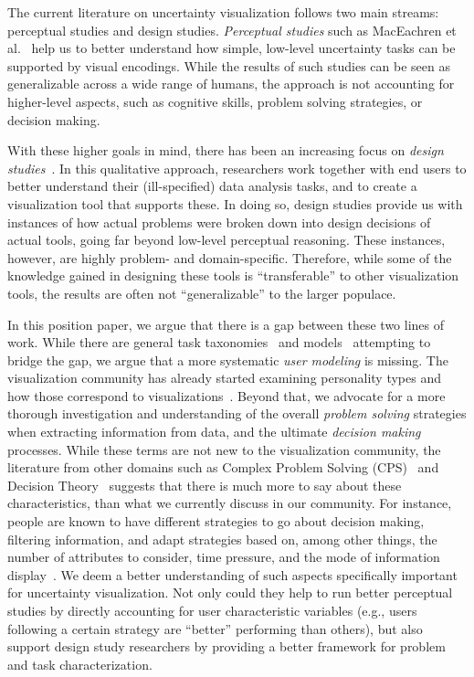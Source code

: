 
The current literature on uncertainty visualization follows two main streams: perceptual studies and design studies.
\emph{Perceptual studies} such as MacEachren et al.~\citep{MacEachren:2012} 
help us to better understand 
how simple, low-level uncertainty tasks can be supported by visual encodings. 
While the results of such studies can be seen as generalizable across a wide 
range of humans, the approach is not accounting for higher-level aspects, such as cognitive skills,
problem solving strategies, or decision making.

With these higher goals in mind, there has been an increasing focus on \emph{design studies}~\citep{Sedlmair:2012}.
In this qualitative approach, researchers work together with end users to better understand their 
(ill-specified) data analysis tasks, and to create a visualization tool
that supports these. In doing so, design studies provide us with instances of how
actual problems were broken down into design decisions of actual tools, going far beyond
low-level perceptual reasoning. These instances, however, are highly problem- and domain-specific.
Therefore, while some of the knowledge gained in designing these tools is
``transferable'' to other visualization tools, the results are often not
``generalizable'' to the larger populace.

In this position paper, we argue that there is a gap between these two lines of work.
While there are general task taxonomies~\citep{Brehmer:2013,Shneiderman:1996} and 
models~\citep{Tory:2004,Sedlmair:2014}
attempting to bridge the gap, we argue that a more systematic \emph{user modeling} is missing.
The visualization community has already started examining personality types and
how those correspond to visualizations~\citep{Conati:2014}. Beyond that, we advocate for a more thorough 
investigation and understanding of the overall \emph{problem solving} strategies when extracting information from data, 
and the ultimate \emph{decision making} processes.
While these terms are not new to the visualization community, the 
literature from other domains such as Complex Problem Solving (CPS)~\citep{Frensch:2005}
and Decision Theory~\citep{Payne:1993} suggests that there is much more to say about these characteristics,
than what we currently discuss in our community. For instance, people are known to have different strategies to go about decision making, filtering information,
and adapt strategies based on, among other things, the number of attributes 
to consider, time pressure, and the mode of information 
display~\cite{Payne:1993}.
We deem a better understanding of such aspects specifically important for uncertainty visualization.
Not only could they help to run better perceptual studies by directly accounting for user characteristic variables 
(e.g., users following a certain strategy are ``better'' performing than others), but also support design study researchers
by providing a better framework for problem and task characterization.

